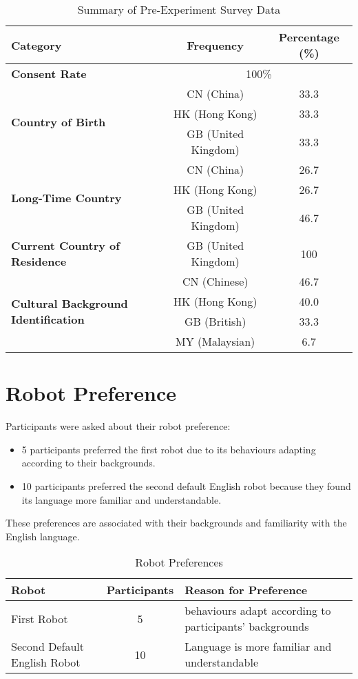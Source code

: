 \begin{table}[htbp]
\centering
\label{tab:pre_experiment_survey}
\begin{tabular}{|l|c|c|}
\hline
\textbf{Category} & \textbf{Frequency} & \textbf{Percentage (\%)} \\ \hline
\textbf{Consent Rate} & \multicolumn{2}{c|}{100\%} \\ \hline
\multirow{3}{*}{\textbf{Country of Birth}} & CN (China) & 33.3 \\
 & HK (Hong Kong) & 33.3 \\
 & GB (United Kingdom) & 33.3 \\ \hline
\multirow{3}{*}{\textbf{Long-Time Country}} & CN (China) & 26.7 \\
 & HK (Hong Kong) & 26.7 \\
 & GB (United Kingdom) & 46.7 \\ \hline
\textbf{Current Country of Residence} & GB (United Kingdom) & 100 \\ \hline
\multirow{4}{*}{\textbf{Cultural Background Identification}} & CN (Chinese) & 46.7 \\
 & HK (Hong Kong) & 40.0 \\
 & GB (British) & 33.3 \\
 & MY (Malaysian) & 6.7 \\ \hline
\end{tabular}
\caption{Summary of Pre-Experiment Survey Data}
\end{table}

\section{Robot Preference}

Participants were asked about their robot preference:
\begin{itemize}
\item 5 participants preferred the first robot due to its behaviours adapting according to their backgrounds.
\item 10 participants preferred the second default English robot because they found its language more familiar and understandable.
\end{itemize}
These preferences are associated with their backgrounds and familiarity with the English language.

\begin{table}[htbp]
\centering
\label{tab:robot_preferences}
\begin{tabular}{|l|c|p{6cm}|}
\hline
\textbf{Robot} & \textbf{Participants} & \textbf{Reason for Preference} \\ \hline
First Robot & 5 & behaviours adapt according to participants' backgrounds \\ \hline
Second Default English Robot & 10 & Language is more familiar and understandable \\ \hline
\end{tabular}
\caption{Robot Preferences}
\end{table}

